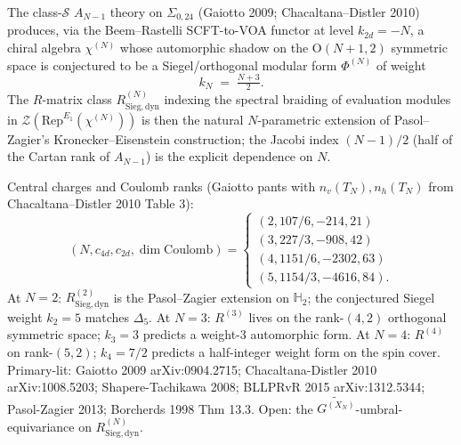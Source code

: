 \begin{remark}[Class-$\mathcal S$ $A_{N-1}$ tower: $k_N = (N{+}3)/2$ and spectral-braiding]
\label{rem:sbf-classS-kN-tower}
The class-$\mathcal S$ $A_{N-1}$ theory on $\Sigma_{0,24}$ (Gaiotto
2009; Chacaltana--Distler 2010) produces, via the Beem--Rastelli
SCFT-to-VOA functor at level $k_{2d} = -N$, a chiral algebra
$\chi^{(N)}$ whose automorphic shadow on the $\mathrm{O}(N{+}1,2)$
symmetric space is conjectured to be a Siegel/orthogonal modular
form $\Phi^{(N)}$ of weight
\[
k_N \;=\; \tfrac{N+3}{2}.
\]
The $R$-matrix class $R^{(N)}_{\mathrm{Sieg,dyn}}$ indexing the
spectral braiding of evaluation modules in
$\mathcal{Z}(\mathrm{Rep}^{E_1}(\chi^{(N)}))$ is then the natural
$N$-parametric extension of Pasol--Zagier's Kronecker--Eisenstein
construction; the Jacobi index $(N-1)/2$ (half of the Cartan rank of
$A_{N-1}$) is the explicit dependence on $N$.

Central charges and Coulomb ranks (Gaiotto pants with
$n_v(T_N), n_h(T_N)$ from Chacaltana--Distler 2010 Table 3):
\[
(N, c_{4d}, c_{2d}, \dim\mathrm{Coulomb}) =
\begin{cases}
(2, 107/6, -214, 21) \\
(3, 227/3, -908, 42) \\
(4, 1151/6, -2302, 63) \\
(5, 1154/3, -4616, 84).
\end{cases}
\]
At $N=2$: $R^{(2)}_{\mathrm{Sieg,dyn}}$ is the Pasol--Zagier extension
on $\mathbb{H}_2$; the conjectured Siegel weight $k_2 = 5$ matches
$\Delta_5$. At $N=3$: $R^{(3)}$ lives on the rank-$(4,2)$ orthogonal
symmetric space; $k_3 = 3$ predicts a weight-$3$ automorphic form. At
$N=4$: $R^{(4)}$ on rank-$(5,2)$; $k_4 = 7/2$ predicts a half-integer
weight form on the spin cover. Primary-lit: Gaiotto 2009
arXiv:0904.2715; Chacaltana-Distler 2010 arXiv:1008.5203;
Shapere-Tachikawa 2008; BLLPRvR 2015 arXiv:1312.5344;
Pasol-Zagier 2013; Borcherds 1998 Thm 13.3. Open: the
$\widetilde{G^{(X_N)}}$-umbral-equivariance on $R^{(N)}_{\mathrm{Sieg,dyn}}$.
\end{remark}
